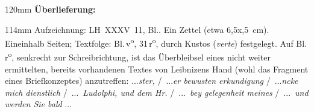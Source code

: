 %
\frenchspacing%
\begin{ledgroupsized}[r]{120mm}%
\footnotesize%
\pstart%
\noindent\textbf{Überlieferung:}
\pend%
\end{ledgroupsized}%
\begin{ledgroupsized}[r]{114mm}%
\footnotesize%
\pstart%
\parindent -6mm%
%
Aufzeichnung:
LH~XXXV~11, Bl.. 
Ein Zettel (etwa 6,5\;x,5~cm).
Eineinhalb Seiten;
Textfolge: Bl.\,v\textsuperscript{o}, 31\,r\textsuperscript{o}, durch Kustos (\textit{verte}) festgelegt.
Auf Bl.\,r\textsuperscript{o}, senkrecht zur Schreibrichtung, ist das Überbleibsel eines nicht weiter ermittelten, bereits vorhandenen Textes von Leibnizens Hand (wohl das Fragment eines Briefkonzeptes) anzutreffen:
\textlangle...\textrangle\textit{ster,} %
\lbrack/\rbrack\
\textlangle...\textrangle\textit{er bewusten erkundigung}
\lbrack/\rbrack\
\textlangle...\textrangle\textit{ncke mich dienstlich}
\lbrack/\rbrack\
\textlangle...\textrangle\
\textit{Ludolphi, und dem Hr.}%
\lbrack/\rbrack\
\textlangle...\textrangle\
\textit{bey gelegenheit meines}
\lbrack/\rbrack\
\textlangle...\textrangle\
\textit{und werden Sie bald}
\textlangle...\textrangle%
\pend%
\end{ledgroupsized}%
\vspace{5mm}%
